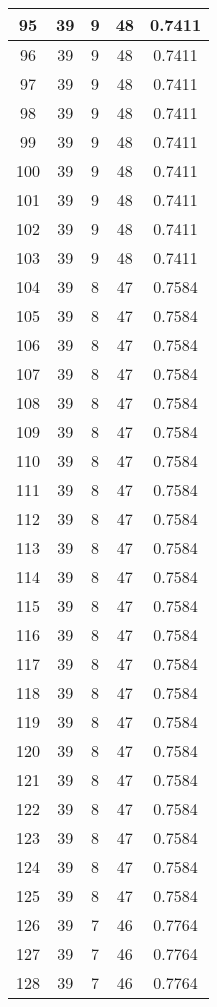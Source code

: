 \documentclass[letterpaper, 12pt]{article}
\begin{document}
\begin{longtable}{|c|c|c|c|c|}
95 & 39 & 9 & 48 & 0.7411 \\
\hline
96 & 39 & 9 & 48 & 0.7411 \\
\hline
97 & 39 & 9 & 48 & 0.7411 \\
\hline
98 & 39 & 9 & 48 & 0.7411 \\
\hline
99 & 39 & 9 & 48 & 0.7411 \\
\hline
100 & 39 & 9 & 48 & 0.7411 \\
\hline
101 & 39 & 9 & 48 & 0.7411 \\
\hline
102 & 39 & 9 & 48 & 0.7411 \\
\hline
103 & 39 & 9 & 48 & 0.7411 \\
\hline
104 & 39 & 8 & 47 & 0.7584 \\
\hline
105 & 39 & 8 & 47 & 0.7584 \\
\hline
106 & 39 & 8 & 47 & 0.7584 \\
\hline
107 & 39 & 8 & 47 & 0.7584 \\
\hline
108 & 39 & 8 & 47 & 0.7584 \\
\hline
109 & 39 & 8 & 47 & 0.7584 \\
\hline
110 & 39 & 8 & 47 & 0.7584 \\
\hline
111 & 39 & 8 & 47 & 0.7584 \\
\hline
112 & 39 & 8 & 47 & 0.7584 \\
\hline
113 & 39 & 8 & 47 & 0.7584 \\
\hline
114 & 39 & 8 & 47 & 0.7584 \\
\hline
115 & 39 & 8 & 47 & 0.7584 \\
\hline
116 & 39 & 8 & 47 & 0.7584 \\
\hline
117 & 39 & 8 & 47 & 0.7584 \\
\hline
118 & 39 & 8 & 47 & 0.7584 \\
\hline
119 & 39 & 8 & 47 & 0.7584 \\
\hline
120 & 39 & 8 & 47 & 0.7584 \\
\hline
121 & 39 & 8 & 47 & 0.7584 \\
\hline
122 & 39 & 8 & 47 & 0.7584 \\
\hline
123 & 39 & 8 & 47 & 0.7584 \\
\hline
124 & 39 & 8 & 47 & 0.7584 \\
\hline
125 & 39 & 8 & 47 & 0.7584 \\
\hline
126 & 39 & 7 & 46 & 0.7764 \\
\hline
127 & 39 & 7 & 46 & 0.7764 \\
\hline
128 & 39 & 7 & 46 & 0.7764 \\

\end{longtable}
\end{document}
